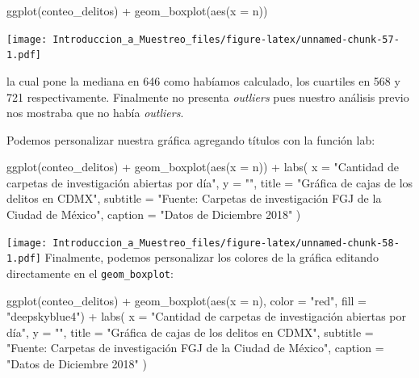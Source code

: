 \documentclass[
]{book}
\newenvironment{Shaded}{\begin{snugshade}}{\end{snugshade}}
\newcommand{\AttributeTok}[1]{\textcolor[rgb]{0.77,0.63,0.00}{#1}}
\newcommand{\FunctionTok}[1]{\textcolor[rgb]{0.00,0.00,0.00}{#1}}
\newcommand{\NormalTok}[1]{#1}
\newcommand{\SpecialCharTok}[1]{\textcolor[rgb]{0.00,0.00,0.00}{#1}}
\newcommand{\StringTok}[1]{\textcolor[rgb]{0.31,0.60,0.02}{#1}}
\begin{document}
\begin{Shaded}
\begin{Highlighting}[]
\FunctionTok{ggplot}\NormalTok{(conteo\_delitos) }\SpecialCharTok{+}
  \FunctionTok{geom\_boxplot}\NormalTok{(}\FunctionTok{aes}\NormalTok{(}\AttributeTok{x =}\NormalTok{ n))}
\end{Highlighting}
\end{Shaded}

\texttt{[image: Introduccion\_a\_Muestreo\_files/figure-latex/unnamed-chunk-57-1.pdf]}

la cual pone la mediana en 646 como habíamos calculado, los cuartiles en 568 y 721 respectivamente. Finalmente no presenta \emph{outliers} pues nuestro análisis previo nos mostraba que no había \emph{outliers}.

Podemos personalizar nuestra gráfica agregando títulos con la función lab:

\begin{Shaded}
\begin{Highlighting}[]
\FunctionTok{ggplot}\NormalTok{(conteo\_delitos) }\SpecialCharTok{+}
  \FunctionTok{geom\_boxplot}\NormalTok{(}\FunctionTok{aes}\NormalTok{(}\AttributeTok{x =}\NormalTok{ n)) }\SpecialCharTok{+}
  \FunctionTok{labs}\NormalTok{(}
    \AttributeTok{x =} \StringTok{"Cantidad de carpetas de investigación abiertas por día"}\NormalTok{,}
    \AttributeTok{y =} \StringTok{""}\NormalTok{,}
    \AttributeTok{title =} \StringTok{"Gráfica de cajas de los delitos en CDMX"}\NormalTok{,}
    \AttributeTok{subtitle =} \StringTok{"Fuente: Carpetas de investigación FGJ de la Ciudad de México"}\NormalTok{,}
    \AttributeTok{caption =} \StringTok{"Datos de Diciembre 2018"}
\NormalTok{  )}
\end{Highlighting}
\end{Shaded}

\texttt{[image: Introduccion\_a\_Muestreo\_files/figure-latex/unnamed-chunk-58-1.pdf]}
Finalmente, podemos personalizar los colores de la gráfica editando directamente en el \texttt{geom\_boxplot}:

\begin{Shaded}
\begin{Highlighting}[]
\FunctionTok{ggplot}\NormalTok{(conteo\_delitos) }\SpecialCharTok{+}
  \FunctionTok{geom\_boxplot}\NormalTok{(}\FunctionTok{aes}\NormalTok{(}\AttributeTok{x =}\NormalTok{ n), }\AttributeTok{color =} \StringTok{"red"}\NormalTok{, }\AttributeTok{fill =} \StringTok{"deepskyblue4"}\NormalTok{) }\SpecialCharTok{+}
  \FunctionTok{labs}\NormalTok{(}
    \AttributeTok{x =} \StringTok{"Cantidad de carpetas de investigación abiertas por día"}\NormalTok{,}
    \AttributeTok{y =} \StringTok{""}\NormalTok{,}
    \AttributeTok{title =} \StringTok{"Gráfica de cajas de los delitos en CDMX"}\NormalTok{,}
    \AttributeTok{subtitle =} \StringTok{"Fuente: Carpetas de investigación FGJ de la Ciudad de México"}\NormalTok{,}
    \AttributeTok{caption =} \StringTok{"Datos de Diciembre 2018"}
\NormalTok{  )}
\end{Highlighting}
\end{Shaded}
\end{document}

